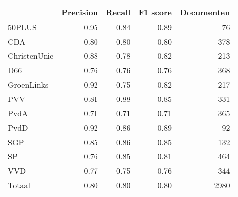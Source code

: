 \begin{tabular}{lrrrr}
\toprule
{} &  Precision &  Recall &  F1 score &  Documenten \\
\midrule
50PLUS       &       0.95 &    0.84 &      0.89 &          76 \\
CDA          &       0.80 &    0.80 &      0.80 &         378 \\
ChristenUnie &       0.88 &    0.78 &      0.82 &         213 \\
D66          &       0.76 &    0.76 &      0.76 &         368 \\
GroenLinks   &       0.92 &    0.75 &      0.82 &         217 \\
PVV          &       0.81 &    0.88 &      0.85 &         331 \\
PvdA         &       0.71 &    0.71 &      0.71 &         365 \\
PvdD         &       0.92 &    0.86 &      0.89 &          92 \\
SGP          &       0.85 &    0.86 &      0.85 &         132 \\
SP           &       0.76 &    0.85 &      0.81 &         464 \\
VVD          &       0.77 &    0.75 &      0.76 &         344 \\
Totaal       &       0.80 &    0.80 &      0.80 &        2980 \\
\bottomrule
\end{tabular}
